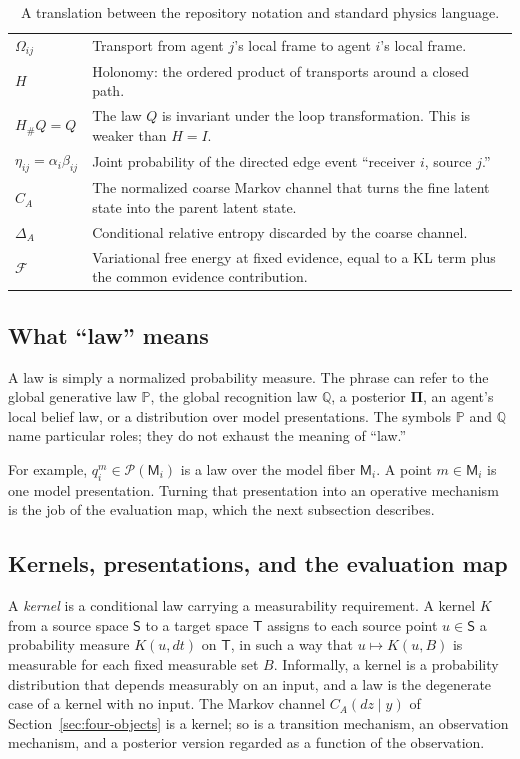 \documentclass[11pt,letterpaper]{article}
\newcommand{\Prob}{\mathbb P}
\newcommand{\Rec}{\mathbb Q}
\newcommand{\Post}{\boldsymbol\Pi}
\newcommand{\Law}{\mathcal P}
\begin{document}
\begin{table}[ht]
\begin{tabularx}{\textwidth}{>{\raggedright\arraybackslash}p{}X}
\(\Omega_{ij}\) & Transport from agent \(j\)'s local frame to agent \(i\)'s local frame. \\
\(H\) & Holonomy: the ordered product of transports around a closed path. \\
\(H_{\#}Q=Q\) & The law \(Q\) is invariant under the loop transformation. This is weaker than \(H=I\). \\
\(\eta_{ij}=\alpha_i\beta_{ij}\) & Joint probability of the directed edge event ``receiver \(i\), source \(j\).'' \\
\(C_A\) & The normalized coarse Markov channel that turns the fine latent state into the parent latent state. \\
\(\Delta_A\) & Conditional relative entropy discarded by the coarse channel. \\
\(\mathcal F\) & Variational free energy at fixed evidence, equal to a KL term plus the common evidence contribution. \\
\bottomrule
\end{tabularx}
\caption{A translation between the repository notation and standard physics language.}
\label{tab:dictionary}
\end{table}

\subsection{What ``law'' means}

A law is simply a normalized probability measure. The phrase can refer to the global generative law \(\Prob\), the global recognition law \(\Rec\), a posterior \(\Post\), an agent's local belief law, or a distribution over model presentations. The symbols \(\Prob\) and \(\Rec\) name particular roles; they do not exhaust the meaning of ``law.''

For example, \(q_i^m\in\Law(\mathsf M_i)\) is a law over the model fiber \(\mathsf M_i\). A point \(m\in\mathsf M_i\) is one model presentation. Turning that presentation into an operative mechanism is the job of the evaluation map, which the next subsection describes.

\subsection{Kernels, presentations, and the evaluation map}
\label{sec:ev}

A \emph{kernel} is a conditional law carrying a measurability requirement. A kernel \(K\) from a source space \(\mathsf S\) to a target space \(\mathsf T\) assigns to each source point \(u\in\mathsf S\) a probability measure \(K(u,dt)\) on \(\mathsf T\), in such a way that \(u\mapsto K(u,B)\) is measurable for each fixed measurable set \(B\). Informally, a kernel is a probability distribution that depends measurably on an input, and a law is the degenerate case of a kernel with no input. The Markov channel \(C_A(dz\mid y)\) of Section~\ref{sec:four-objects} is a kernel; so is a transition mechanism, an observation mechanism, and a posterior version regarded as a function of the observation.
\end{document}
